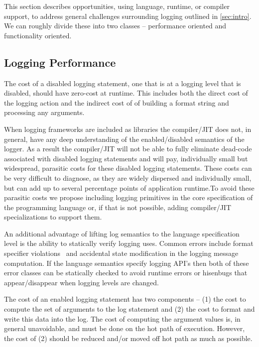 This section describes opportunities, using language, runtime, or compiler support, to address 
general challenges surrounding logging outlined in \autoref{sec:intro}. We can roughly divide 
these into two classes -- performance oriented and functionality oriented. 

\subsection{Logging Performance}
\label{subsec:performancedesign}

\begin{design}
The cost of a disabled logging statement, one that is at a logging level that is disabled, 
should have zero-cost at runtime. This includes both the direct cost of the logging action 
and the indirect cost of of building a format string and processing any arguments. 
\end{design}

When logging frameworks are included as libraries the compiler/JIT does not, 
in general, have any deep understanding of the enabled/disabled semantics of 
the logger. As a result the compiler/JIT will not be able to fully eliminate 
dead-code associated with disabled logging statements and will pay, individually 
small but widespread, parasitic costs for these disabled logging statements. 
These costs can be very difficult to diagnose, as they are widely dispersed and 
individually small, but can add up to several percentage points of application 
runtime.To avoid these parasitic costs we propose including logging primitives 
in the core specification of the programming language or, if that is not possible, 
adding compiler/JIT specializations to support them. 

An additional advantage of lifting log semantics to the language specification 
level is the ability to statically verify logging uses. Common errors include 
format specifier violations~\cite{tyepcheckprintf} and accidental state 
modification in the logging message computation. If the language semantics 
specify logging API's then both of these error classes can be statically 
checked to avoid runtime errors or hisenbugs that appear/disappear when logging 
levels are changed.

\begin{design}
The cost of an enabled logging statement has two components -- (1) the cost to 
compute the set of arguments to the log statement and (2) the cost to format and 
write this data into the log. The cost of computing the argument values is, in 
general unavoidable, and must be done on the hot path of execution. However, 
the cost of (2) should be reduced and/or moved off hot path as much as possible.
\end{design}

